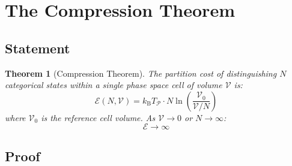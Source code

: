 \documentclass[twocolumn,10pt,a4paper]{article}
\newtheorem{theorem}{Theorem}[section]
\theoremstyle{definition}
\theoremstyle{remark}
\newcommand{\kB}{k_{\mathrm{B}}}
\newcommand{\Partition}{\mathcal{P}}
\newcommand{\Cost}{\mathcal{E}}
\begin{document}
\section{The Compression Theorem}
\label{sec:compression}

\subsection{Statement}

\begin{theorem}[Compression Theorem]
\label{thm:compression}
The partition cost of distinguishing $N$ categorical states within a single phase space cell of volume $\mathcal{V}$ is:
\begin{equation}
    \Cost(N, \mathcal{V}) = \kB T_{\Partition} \cdot N \ln\left(\frac{\mathcal{V}_0}{\mathcal{V}/N}\right)
\end{equation}
where $\mathcal{V}_0$ is the reference cell volume. As $\mathcal{V} \to 0$ or $N \to \infty$:
\begin{equation}
    \Cost \to \infty
\end{equation}
\end{theorem}

\subsection{Proof}
\end{document}
